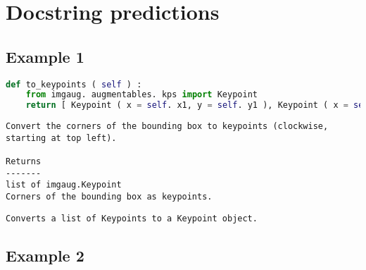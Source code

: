 \section{Docstring predictions} \label{docstr_pred}
    
\subsection{Example 1}

    \begin{lstlisting}[language=Python, caption={Input code}]
def to_keypoints ( self ) : 
    from imgaug. augmentables. kps import Keypoint 
    return [ Keypoint ( x = self. x1, y = self. y1 ), Keypoint ( x = self. x2, y = self. y1 ), Keypoint ( x = self. x2, y = self. y2 ), Keypoint ( x = self. x1, y = self. y2 ) ] 
    \end{lstlisting}
    \begin{lstlisting}[caption={Label}]
Convert the corners of the bounding box to keypoints (clockwise, starting at top left).

Returns
-------
list of imgaug.Keypoint
Corners of the bounding box as keypoints.
    \end{lstlisting}
    \begin{lstlisting}[caption={Prediction}]
Converts a list of Keypoints to a Keypoint object.
    \end{lstlisting}

\subsection{Example 2}

